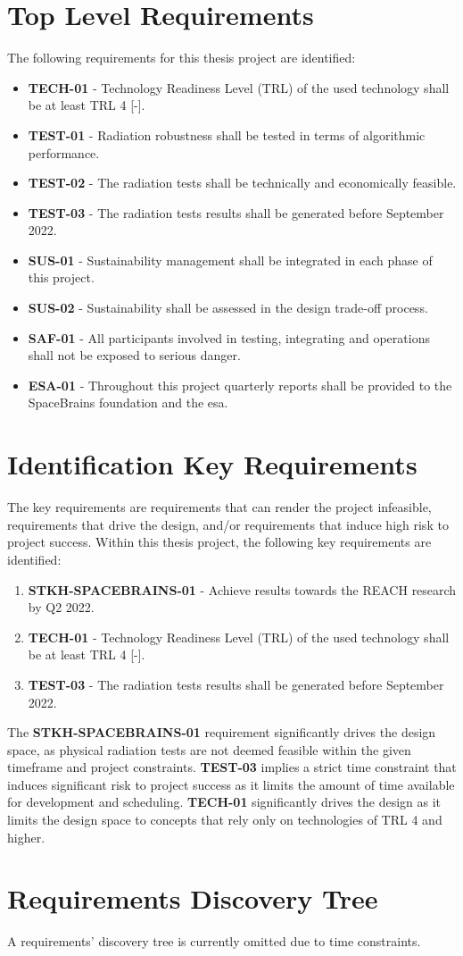 \section{Top Level Requirements}\label{sec:baseline_top_level_requirements}
The following requirements for this thesis project are identified:
\begin{itemize}
	\item \textbf{TECH-01} - Technology Readiness Level (TRL) of the used technology shall be at least TRL 4 [-].
	\item \textbf{TEST-01} - Radiation robustness shall be tested in terms of algorithmic performance.
	\item \textbf{TEST-02} - The radiation tests shall be technically and economically feasible.
	\item \textbf{TEST-03} - The radiation tests results shall be generated before September 2022.
	\item \textbf{SUS-01} - Sustainability management shall be integrated in each phase of this project.
	\item \textbf{SUS-02} - Sustainability shall be assessed in the design trade-off process.
	\item \textbf{SAF-01} - All participants involved in testing, integrating and operations shall not be exposed to serious danger. %
	\item \textbf{ESA-01} - Throughout this project quarterly reports shall be provided to the SpaceBrains foundation and the \acrfull{esa}.
\end{itemize}

\section{Identification Key Requirements}\label{sec:baseline_identification_key_requirements}
The key requirements are requirements that can render the project infeasible, requirements that drive the design, and/or requirements that induce high risk to project success. Within this thesis project, the following key requirements are identified:
\begin{enumerate}
    \item \textbf{STKH-SPACEBRAINS-01} - Achieve results towards the REACH research by Q2 2022.
    \item \textbf{TECH-01} - Technology Readiness Level (TRL) of the used technology shall be at least TRL 4 [-].
	\item \textbf{TEST-03} - The radiation tests results shall be generated before September 2022.
\end{enumerate}
The \textbf{STKH-SPACEBRAINS-01} requirement significantly drives the design space, as physical radiation tests are not deemed feasible within the given timeframe and project constraints. \textbf{TEST-03} implies a strict time constraint that induces significant risk to project success as it limits the amount of time available for development and scheduling. \textbf{TECH-01} significantly drives the design as it limits the design space to concepts that rely only on technologies of TRL 4 and higher. 

\section{Requirements Discovery Tree}\label{sec:baseline_requirements_discovery_tree}
A requirements' discovery tree is currently omitted due to time constraints.
